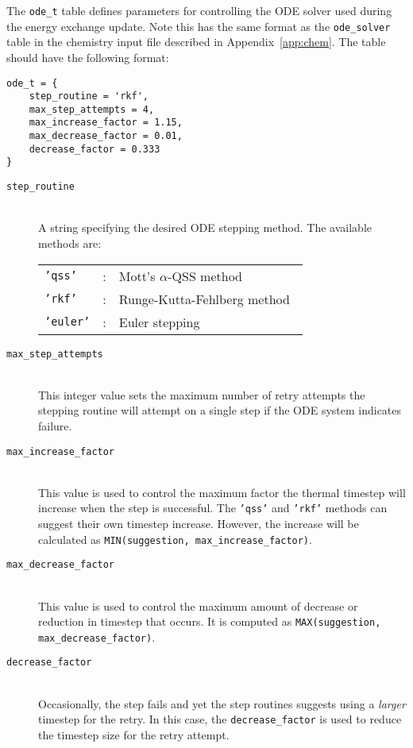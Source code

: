 \par

The \texttt{ode\_t} table defines parameters for controlling the ODE solver used during the
energy exchange update.
Note this has the same format as the \texttt{ode\_solver} table in the chemistry input
file described in Appendix~\ref{app:chem}.
The table should have the following format:

\begin{verbatim}
ode_t = {
    step_routine = 'rkf',
    max_step_attempts = 4,
    max_increase_factor = 1.15,
    max_decrease_factor = 0.01,
    decrease_factor = 0.333
}
\end{verbatim}

\begin{description}
 \item[\texttt{step\_routine}] \hspace{1cm} \\
 A string specifying the desired ODE stepping method.
 The available methods are:
   \begin{tabular}{lll}
    \texttt{'qss'} & : & Mott's $\alpha$-QSS method~\cite{mott_99a} \\
    \texttt{'rkf'} & : & Runge-Kutta-Fehlberg method~\cite{fehlberg_69a} \\
    \texttt{'euler'} & : & Euler stepping \\
   \end{tabular}
\item[\texttt{max\_step\_attempts}] \hspace{1cm} \\
    This integer value sets the maximum number of retry attempts the stepping
    routine will attempt on a single step if the ODE system indicates failure.
\item[\texttt{max\_increase\_factor}] \hspace{1cm} \\
    This value is used to control the maximum factor the thermal timestep
    will increase when the step is successful.  The \texttt{'qss'} and \texttt{'rkf'}
    methods can suggest their own timestep increase. However, the increase will
    be calculated as \texttt{MIN(suggestion, max\_increase\_factor)}.
\item[\texttt{max\_decrease\_factor}] \hspace{1cm} \\
    This value is used to control the maximum amount of decrease or reduction
    in timestep that occurs.  It is computed as \texttt{MAX(suggestion, max\_decrease\_factor)}.
\item[\texttt{decrease\_factor}] \hspace{1cm} \\
    Occasionally, the step fails and yet the step routines suggests using a \emph{larger}
    timestep for the retry.  In this case, the \texttt{decrease\_factor} is used to reduce
    the timestep size for the retry attempt.
\end{description}

